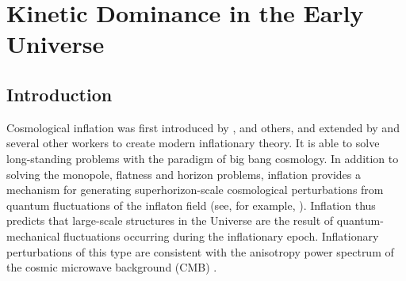 \newcommand{\rhoph}{\rho_\phi}
\newcommand{\Pph}{P_\phi}


\newcommand{\Nflat}{N_\mathrm{e}}
\newcommand{\Nflatp}{\prm{N_\mathrm{e}}}
\newcommand{\Nflatpp}{\dprm{N_\mathrm{e}}}
\newcommand{\Hflat}{\dot{N}_\mathrm{e}}
\newcommand{\dHflat}{\ddot{N}_\mathrm{e}}


\def\tfrac#1#2{{\textstyle\frac{#1}{#2}}}


\newcommand{\difrac}[2]{\frac{d #1}{d #2}}    %
\newcommand{\prm}[1]{{{#1}^\prime}}           %
\newcommand{\dprm}[1]{{{#1}^{\prime\prime}}}  %

\newcommand{\abs}[1]{\left|#1\right|}  


\newcommand{\eref}[1]{\nolinebreak(\ref{#1})}  %
\newcommand{\Sref}[1]{Sec.\ \nolinebreak\ref{#1}}        %
\newcommand{\Fref}[1]{Fig.\ \nolinebreak\ref{#1}}         %





\chapter{Kinetic Dominance in the Early Universe}
\label{chap:kd}

\section{Introduction}

Cosmological inflation was first introduced by
\citet{starobinskii_spectrum_1979}, \citet{guth_inflationary_1981} and
others, and extended by \citet{linde_1982} and several other workers
to create modern inflationary theory. It is able to solve
long-standing problems with the paradigm of big bang cosmology. In
addition to solving the monopole, flatness and horizon problems,
inflation provides a mechanism for generating superhorizon-scale
cosmological perturbations from quantum fluctuations of the inflaton
field (see, for example, \citet{mukhanov_theory_1992}). Inflation thus
predicts that large-scale structures in the Universe are the result of
quantum-mechanical fluctuations occurring during the inflationary
epoch. Inflationary perturbations of this type are consistent with the
anisotropy power spectrum of the cosmic microwave background (CMB)
\citep{hinshaw_nine-year_2012,planck_collaboration_planck_2013}.

